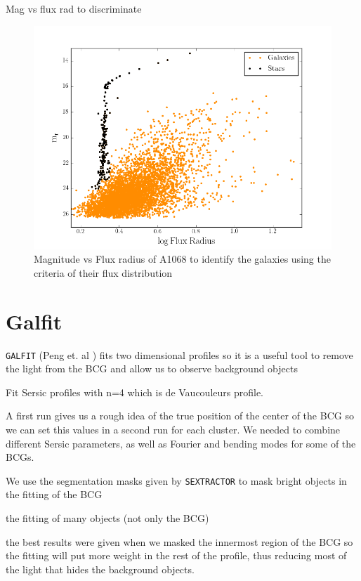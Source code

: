 Mag vs flux rad to discriminate

\begin{figure}[H]
\centering
\includegraphics[width=12cm]{images/mag_vs_flux_rad.png}
\caption[Magnitude vs Flux radius of A1068]{Magnitude vs Flux radius of A1068 to identify the galaxies using the criteria of their flux distribution}
\end{figure}

\section{Galfit}

\texttt{GALFIT} (Peng et. al \citeyear{Reference20}) fits two dimensional profiles so it is a useful tool to remove the light from the BCG and allow us to observe background objects

Fit Sersic profiles with n=4 which is de Vaucouleurs profile. 

A first run gives us a rough idea of the true position of the center of the BCG so we can set this values in a second run for each cluster. We needed to combine different Sersic parameters, as well as Fourier and bending modes for some of the BCGs.

We use the segmentation masks given by \texttt{SEXTRACTOR} to mask bright objects in the fitting of the BCG

the fitting of many objects (not only the BCG)

the best results were given when we masked the innermost region of the BCG so the fitting will put more weight in the rest of the profile, thus reducing most of the light that hides the background objects.

